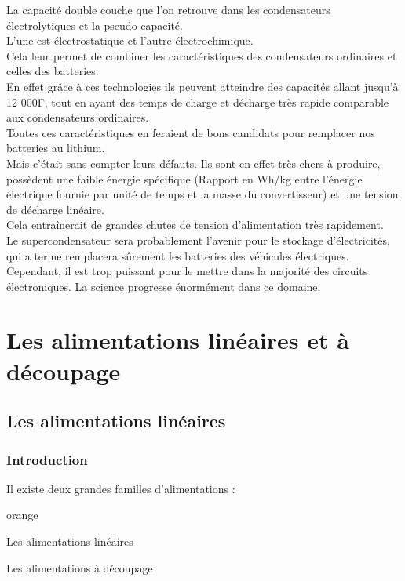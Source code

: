La capacité double couche que l’on retrouve dans les condensateurs électrolytiques et la pseudo-capacité. \\
L’une est électrostatique et l’autre électrochimique.\\


Cela leur permet de combiner les caractéristiques des condensateurs ordinaires et celles des batteries.\\ 
En effet grâce à ces technologies ils peuvent atteindre des capacités allant jusqu’à 12 000F, tout en ayant des temps de charge et décharge très rapide comparable aux condensateurs ordinaires.\\
 Toutes ces caractéristiques en feraient de bons candidats pour remplacer nos batteries au lithium.\\
 
 Mais c’était sans compter leurs défauts. Ils sont en effet très chers à produire, possèdent une faible énergie spécifique (Rapport en Wh/kg entre l’énergie électrique fournie par unité de temps et la masse du convertisseur) et une tension de décharge linéaire.\\
 Cela entraînerait de grandes chutes de tension d’alimentation très rapidement.\\

Le supercondensateur sera probablement l'avenir pour le stockage d'électricités, qui a terme remplacera sûrement les batteries des véhicules électriques.\\

Cependant, il est trop puissant pour le mettre dans la majorité des circuits électroniques. La science progresse énormément dans ce domaine. 
\part{Les alimentations linéaires et à découpage}

\chapter{Les alimentations linéaires}
\section{Introduction}

Il existe deux grandes familles d'alimentations : 

\begin{items}{orange}{\Triangle}
    \item Les alimentations linéaires
    \item Les alimentations à découpage 
\end{items}

